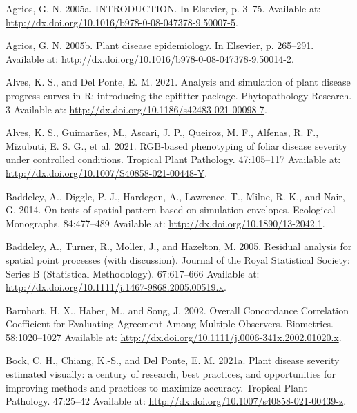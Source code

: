 \documentclass[
  letterpaper,
]{book}
\newlength{\cslhangindent}
\newlength{\cslentryspacingunit} %
\newenvironment{CSLReferences}[2] %
 {%
  \setlength{\parindent}{0pt}
  \ifodd #1
  \let\oldpar\par
  \def\par{\hangindent=\cslhangindent\oldpar}
  \fi
  \setlength{\parskip}{#2\cslentryspacingunit}
 }%
 {}
\begin{document}

\hypertarget{refs}{}
\begin{CSLReferences}{0}{0}
\leavevmode{}%
Agrios, G. N. 2005a. INTRODUCTION. In Elsevier, p. 3--75. Available at:
\url{http://dx.doi.org/10.1016/b978-0-08-047378-9.50007-5}.

\leavevmode{}%
Agrios, G. N. 2005b. Plant disease epidemiology. In Elsevier, p.
265--291. Available at:
\url{http://dx.doi.org/10.1016/b978-0-08-047378-9.50014-2}.

\leavevmode{}%
Alves, K. S., and Del Ponte, E. M. 2021. Analysis and simulation of
plant disease progress curves in R: introducing the epifitter package.
Phytopathology Research. 3 Available at:
\url{http://dx.doi.org/10.1186/s42483-021-00098-7}.

\leavevmode{}%
Alves, K. S., Guimarães, M., Ascari, J. P., Queiroz, M. F., Alfenas, R.
F., Mizubuti, E. S. G., et al. 2021. RGB-based phenotyping of foliar
disease severity under controlled conditions. Tropical Plant Pathology.
47:105--117 Available at:
\url{http://dx.doi.org/10.1007/S40858-021-00448-Y}.

\leavevmode{}%
Baddeley, A., Diggle, P. J., Hardegen, A., Lawrence, T., Milne, R. K.,
and Nair, G. 2014. On tests of spatial pattern based on simulation
envelopes. Ecological Monographs. 84:477--489 Available at:
\url{http://dx.doi.org/10.1890/13-2042.1}.

\leavevmode{}%
Baddeley, A., Turner, R., Moller, J., and Hazelton, M. 2005. Residual
analysis for spatial point processes (with discussion). Journal of the
Royal Statistical Society: Series B (Statistical Methodology).
67:617--666 Available at:
\url{http://dx.doi.org/10.1111/j.1467-9868.2005.00519.x}.

\leavevmode{}%
Barnhart, H. X., Haber, M., and Song, J. 2002. Overall Concordance
Correlation Coefficient for Evaluating Agreement Among Multiple
Observers. Biometrics. 58:1020--1027 Available at:
\url{http://dx.doi.org/10.1111/j.0006-341x.2002.01020.x}.

\leavevmode{}%
Bock, C. H., Chiang, K.-S., and Del Ponte, E. M. 2021a. Plant disease
severity estimated visually: a century of research, best practices, and
opportunities for improving methods and practices to maximize accuracy.
Tropical Plant Pathology. 47:25--42 Available at:
\url{http://dx.doi.org/10.1007/s40858-021-00439-z}.


\end{CSLReferences}
\end{document}
